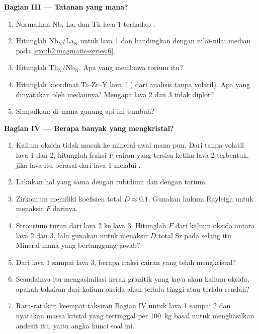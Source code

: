 \begin{problem}
\noindent\textbf{Bagian III --- Tatanan yang mana?}
\begin{enumerate}[resume]
\item Normalkan Nb, La, dan Th lava 1 terhadap .
\item Hitunglah $\mathrm{Nb_N}/\mathrm{La_N}$ untuk lava 1 dan bandingkan dengan nilai-nilai median
pada \cref{exo:b2:magmatic-series:6}.
\item Hitunglah $\mathrm{Th_N}/\mathrm{Nb_N}$. Apa yang membawa torium itu?
\item Hitunglah koordinat Ti--Zr--Y lava 1 ( dari analisis tanpa
volatil). Apa yang dinyatakan oleh medannya? Mengapa lava 2 dan 3 tidak diplot?
\item Simpulkan: di mana gunung api ini tumbuh?
\end{enumerate}

\noindent\textbf{Bagian IV --- Berapa banyak yang mengkristal?}
\begin{enumerate}[resume]
\item Kalium oksida tidak masuk ke mineral awal mana pun. Dari  tanpa volatil
lava 1 dan 2, hitunglah fraksi $F$ cairan yang tersisa ketika lava 2 terbentuk, jika lava itu
berasal dari lava 1 melalui .
\item Lakukan hal yang sama dengan rubidium dan dengan torium.
\item Zirkonium memiliki koefisien total $D \approx 0.1$. Gunakan hukum Rayleigh untuk menaksir $F$ darinya.
\item Stronsium turun dari lava 2 ke lava 3. Hitunglah $F$ dari kalium oksida antara lava 2 dan
3, lalu gunakan untuk menaksir $D$ total Sr pada selang itu. Mineral mana yang
bertanggung jawab?
\item Dari lava 1 sampai lava 3, berapa fraksi cairan yang telah mengkristal?
\item Seandainya  itu mengasimilasi kerak granitik yang kaya akan kalium oksida, apakah taksiran
dari kalium oksida akan terlalu tinggi atau terlalu rendah?
\item Rata-ratakan keempat taksiran Bagian IV untuk lava 1 sampai 2 dan nyatakan massa
kristal yang tertinggal per \qty{100}{kg} basal untuk menghasilkan andesit itu, yaitu angka kunci
soal ini.
\end{enumerate}
\end{problem}
